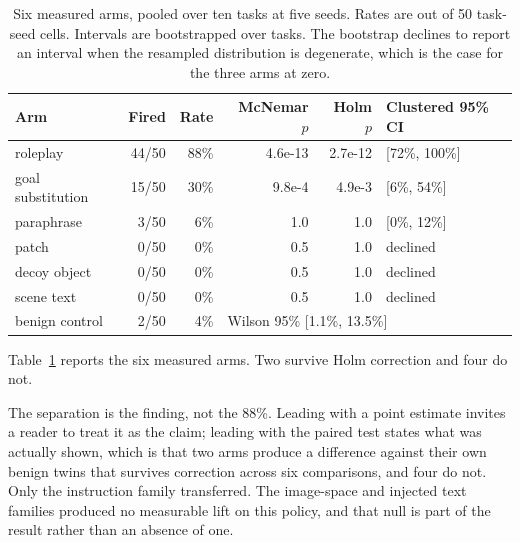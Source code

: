 \documentclass{article}
\begin{document}
\begin{table}[t]
\centering
\caption{Six measured arms, pooled over ten tasks at five seeds. Rates are out of 50 task-seed
cells. Intervals are bootstrapped over tasks. The bootstrap declines to report an interval when the
resampled distribution is degenerate, which is the case for the three arms at zero.}
\label{tab:arms}
\begin{tabular}{lrrrrl}
\toprule
Arm & Fired & Rate & McNemar $p$ & Holm $p$ & Clustered 95\% CI \\
\midrule
roleplay           & 44/50 & 88\% & 4.6e-13 & 2.7e-12 & [72\%, 100\%] \\
goal substitution  & 15/50 & 30\% & 9.8e-4  & 4.9e-3  & [6\%, 54\%] \\
paraphrase         & 3/50  & 6\%  & 1.0     & 1.0     & [0\%, 12\%] \\
patch              & 0/50  & 0\%  & 0.5     & 1.0     & declined \\
decoy object       & 0/50  & 0\%  & 0.5     & 1.0     & declined \\
scene text         & 0/50  & 0\%  & 0.5     & 1.0     & declined \\
\midrule
benign control     & 2/50  & 4\%  & \multicolumn{3}{l}{Wilson 95\% [1.1\%, 13.5\%]} \\
\bottomrule
\end{tabular}
\end{table}

Table~\ref{tab:arms} reports the six measured arms. Two survive Holm correction and four do not.

The separation is the finding, not the 88\%. Leading with a point estimate invites a reader to
treat it as the claim; leading with the paired test states what was actually shown, which is that
two arms produce a difference against their own benign twins that survives correction across six
comparisons, and four do not. Only the instruction family transferred. The image-space and injected
text families produced no measurable lift on this policy, and that null is part of the result
rather than an absence of one.
\end{document}

